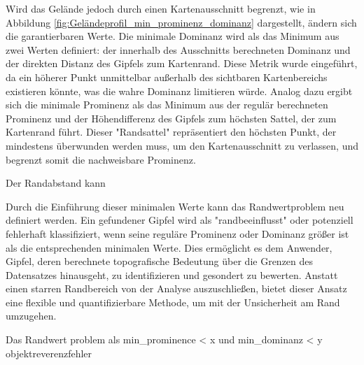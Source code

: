 Wird das Gelände jedoch durch einen Kartenausschnitt begrenzt, wie in Abbildung \ref{fig:Geländeprofil_min_prominenz_dominanz} dargestellt, ändern sich die garantierbaren Werte. Die minimale Dominanz wird als das Minimum aus zwei Werten definiert: der innerhalb des Ausschnitts berechneten Dominanz und der direkten Distanz des Gipfels zum Kartenrand. Diese Metrik wurde eingeführt, da ein höherer Punkt unmittelbar außerhalb des sichtbaren Kartenbereichs existieren könnte, was die wahre Dominanz limitieren würde. Analog dazu ergibt sich die minimale Prominenz als das Minimum aus der regulär berechneten Prominenz und der Höhendifferenz des Gipfels zum höchsten Sattel, der zum Kartenrand führt. Dieser "Randsattel" repräsentiert den höchsten Punkt, der mindestens überwunden werden muss, um den Kartenausschnitt zu verlassen, und begrenzt somit die nachweisbare Prominenz.

Der Randabstand kann  

Durch die Einführung dieser minimalen Werte kann das Randwertproblem neu definiert werden. Ein gefundener Gipfel wird als "randbeeinflusst" oder potenziell fehlerhaft klassifiziert, wenn seine reguläre Prominenz oder Dominanz größer ist als die entsprechenden minimalen Werte. Dies ermöglicht es dem Anwender, Gipfel, deren berechnete topografische Bedeutung über die Grenzen des Datensatzes hinausgeht, zu identifizieren und gesondert zu bewerten. Anstatt einen starren Randbereich von der Analyse auszuschließen, bietet dieser Ansatz eine flexible und quantifizierbare Methode, um mit der Unsicherheit am Rand umzugehen. 

Das Randwert problem als min\_prominence < x und min\_dominanz < y
 objektreverenzfehler